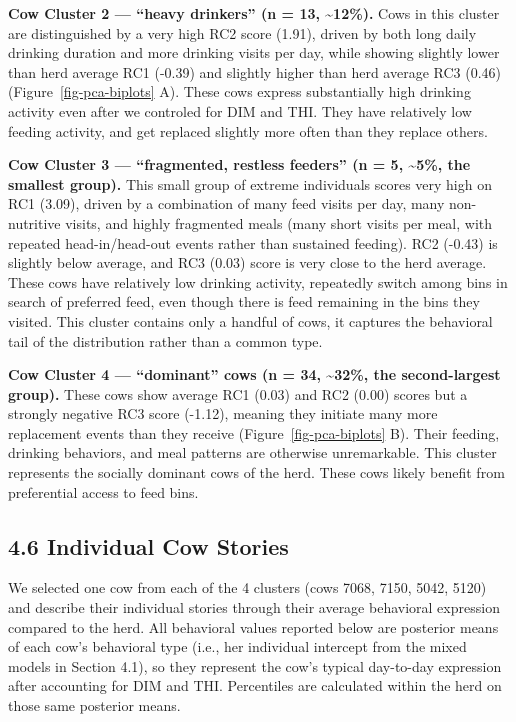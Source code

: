 \documentclass[
]{article}
\begin{document}
\textbf{Cow Cluster 2 --- ``heavy drinkers'' (n = 13,
\textasciitilde12\%).} Cows in this cluster are distinguished by a very
high RC2 score (1.91), driven by both long daily drinking duration and
more drinking visits per day, while showing slightly lower than herd
average RC1 (-0.39) and slightly higher than herd average RC3 (0.46)
(Figure~\ref{fig-pca-biplots} A). These cows express substantially high
drinking activity even after we controled for DIM and THI. They have
relatively low feeding activity, and get replaced slightly more often
than they replace others.

\textbf{Cow Cluster 3 --- ``fragmented, restless feeders'' (n = 5,
\textasciitilde5\%, the smallest group).} This small group of extreme
individuals scores very high on RC1 (3.09), driven by a combination of
many feed visits per day, many non-nutritive visits, and highly
fragmented meals (many short visits per meal, with repeated
head-in/head-out events rather than sustained feeding). RC2 (-0.43) is
slightly below average, and RC3 (0.03) score is very close to the herd
average. These cows have relatively low drinking activity, repeatedly
switch among bins in search of preferred feed, even though there is feed
remaining in the bins they visited. This cluster contains only a handful
of cows, it captures the behavioral tail of the distribution rather than
a common type.

\textbf{Cow Cluster 4 --- ``dominant'' cows (n = 34,
\textasciitilde32\%, the second-largest group).} These cows show average
RC1 (0.03) and RC2 (0.00) scores but a strongly negative RC3 score
(-1.12), meaning they initiate many more replacement events than they
receive (Figure~\ref{fig-pca-biplots} B). Their feeding, drinking
behaviors, and meal patterns are otherwise unremarkable. This cluster
represents the socially dominant cows of the herd. These cows likely
benefit from preferential access to feed bins.

\subsection{4.6 Individual Cow Stories}\label{individual-cow-stories}

We selected one cow from each of the 4 clusters (cows 7068, 7150, 5042,
5120) and describe their individual stories through their average
behavioral expression compared to the herd. All behavioral values
reported below are posterior means of each cow's behavioral type (i.e.,
her individual intercept from the mixed models in Section 4.1), so they
represent the cow's typical day-to-day expression after accounting for
DIM and THI. Percentiles are calculated within the herd on those same
posterior means.
\end{document}
